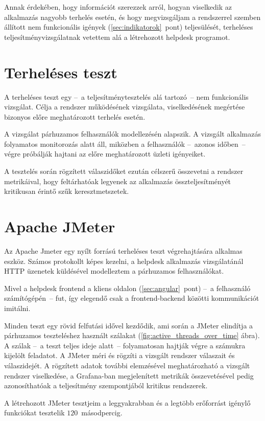 Annak érdekében, hogy információt szerezzek arról, hogyan viselkedik az alkalmazás nagyobb terhelés esetén, és hogy megvizsgáljam a rendszerrel szemben állított nem funkcionális igények  (\ref{sec:indikatorok}~pont)  teljesülését,	terheléses teljesítményvizsgálatnak vetettem alá a létrehozott helpdesk programot.


\section{Terheléses teszt}
A terheléses teszt egy --~a teljesítménytesztelés alá tartozó~-- nem funkcionális vizsgálat. Célja a rendszer működésének vizsgálata, viselkedésének megértése bizonyos előre meghatározott terhelés esetén.

A vizsgálat párhuzamos felhasználók modellezésén alapszik. A vizsgált alkalmazás folyamatos monitorozás alatt áll, miközben a felhasználók --~azonos időben~-- végre próbálják hajtani az előre meghatározott üzleti igényeiket.

A tesztelés során rögzített válaszidőket ezután célszerű összevetni a rendszer metrikáival, hogy feltárhatóak legyenek az alkalmazás összteljesítményét kritikusan érintő szűk keresztmetszetek.


\section{Apache JMeter}	
Az Apache Jmeter egy nyílt forrású terheléses teszt végrehajtására alkalmas eszköz. Számos protokollt képes kezelni, a helpdesk alkalmazás vizsgálatánál HTTP üzenetek küldésével modelleztem a párhuzamos felhasználókat.

Mivel a helpdesk frontend a kliens oldalon (\ref{sec:angular}~pont) --~a felhasználó számítógépén~-- fut, így elegendő csak a frontend-backend közötti kommunikációt imitálni.

Minden teszt egy rövid felfutási idővel kezdődik, ami során a JMeter elindítja a párhuzamos teszteléshez használt szálakat (\ref{fig:active_threads_over_time} ábra). A szálak --~a teszt teljes ideje alatt~-- folyamatosan hajtják végre a számukra kijelölt feladatot. A JMeter méri és rögzíti a vizsgált rendszer válaszait és válaszidejét. A rögzített adatok további elemzésével meghatározható a vizsgált rendszer viselkedése, a Grafana-ban megjelenített metrikák összevetésével pedig azonosíthatóak a teljesítmény szempontjából kritikus rendszerek.

A létrehozott JMeter tesztjeim a leggyakrabban és a legtöbb erőforrást igénylő funkciókat tesztelik $120$~másodpercig.


